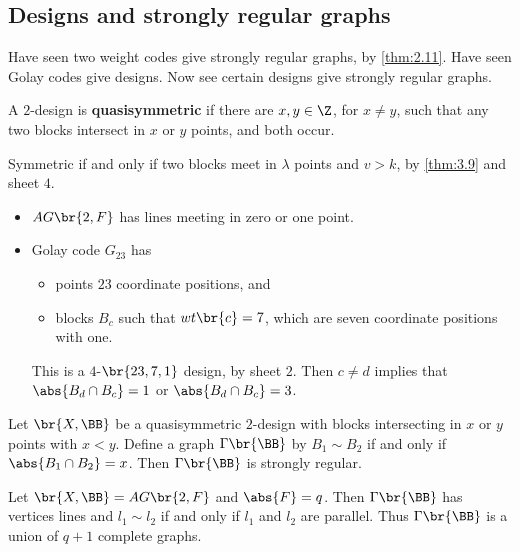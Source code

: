 \pagebreak

\subsection{Designs and strongly regular graphs}

Have seen two weight codes give strongly regular graphs, by \ref{thm:2.11}. Have seen Golay codes give designs. Now see certain designs give strongly regular graphs.


\begin{definition*}
A $ 2 $-design is \textbf{quasisymmetric} if there are $ x, y \in \Z $, for $ x \ne y $, such that any two blocks intersect in $ x $ or $ y $ points, and both occur.
\end{definition*}

\begin{note*}
Symmetric if and only if two blocks meet in $ \lambda $ points and $ v > k $, by \ref{thm:3.9} and sheet $ 4 $.
\end{note*}

\begin{example*}
\hfill
\begin{itemize}
\item $ AG\br{2, F} $ has lines meeting in zero or one point.
\item Golay code $ G_{23} $ has
\begin{itemize}
\item points $ 23 $ coordinate positions, and
\item blocks $ B_c $ such that $ wt\br{c} = 7 $, which are seven coordinate positions with one.
\end{itemize}
This is a $ 4 $-$ \br{23, 7, 1} $ design, by sheet $ 2 $. Then $ c \ne d $ implies that $ \abs{B_d \cap B_c} = 1 $ or $ \abs{B_d \cap B_c} = 3 $.
\end{itemize}
\end{example*}

\begin{theorem}
\label{thm:3.18}
Let $ \br{X, \BB} $ be a quasisymmetric $ 2 $-design with blocks intersecting in $ x $ or $ y $ points with $ x < y $. Define a graph $ \Gamma\br{\BB} $ by $ B_1 \sim B_2 $ if and only if $ \abs{B_1 \cap B_2} = x $. Then $ \Gamma\br{\BB} $ is strongly regular.
\end{theorem}

\begin{example*}
Let $ \br{X, \BB} = AG\br{2, F} $ and $ \abs{F} = q $. Then $ \Gamma\br{\BB} $ has vertices lines and $ l_1 \sim l_2 $ if and only if $ l_1 $ and $ l_2 $ are parallel. Thus $ \Gamma\br{\BB} $ is a union of $ q + 1 $ complete graphs.
\end{example*}

